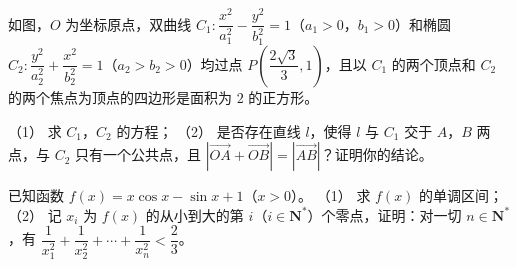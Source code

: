 \begin{question}
如图，$O$ 为坐标原点，双曲线 $C_1:\dfrac{x^2}{a_1^2}-\dfrac{y^2}{b_1^2}=1$（$a_1>0$，$b_1>0$）和椭圆 $C_2:\dfrac{y^2}{a_2^2}+\dfrac{x^2}{b_2^2}=1$（$a_2>b_2>0$）均过点 $P\left(\dfrac{2\sqrt3}3,1\right)$，且以 $C_1$ 的两个顶点和 $C_2$ 的两个焦点为顶点的四边形是面积为 $2$ 的正方形。
\nopagebreak[4]
\begin{center}\end{center}
\nopagebreak[4]
（1） 求 $C_1$，$C_2$ 的方程；
（2） 是否存在直线 $l$，使得 $l$ 与 $C_1$ 交于 $A$，$B$ 两点，与 $C_2$ 只有一个公共点，且 $|\overrightarrow{OA}+\overrightarrow{OB}|=|\overrightarrow{AB}|$？证明你的结论。
\end{question}
\begin{question}
已知函数 $f(x)=x\cos x-\sin x+1$（$x>0$）。
（1） 求 $f(x)$ 的单调区间；
（2） 记 $x_i$ 为 $f(x)$ 的从小到大的第 $i$（$i\in\mathbf N^*$）个零点，证明：对一切 $n\in\mathbf N^*$，有 $\dfrac1{x_1^2}+\dfrac1{x_2^2}+\cdots+\dfrac1{x_n^2}<\dfrac23$。

\end{question}